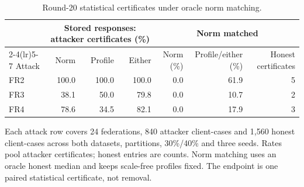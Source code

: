 \begin{table}[t]\centering\footnotesize\setlength{\tabcolsep}{4pt}
\caption{Round-20 statistical certificates under oracle norm matching.}\label{tab:norm-matching}
\begin{tabular}{lrrrrrr}\toprule
& \multicolumn{3}{c}{Stored responses: attacker certificates (\%)} & \multicolumn{3}{c}{Norm matched} \\
\cmidrule(lr){2-4}\cmidrule(lr){5-7}
Attack & Norm & Profile & Either & Norm (\%) & Profile/either (\%) & Honest certificates \\ \midrule
FR2 & 100.0 & 100.0 & 100.0 & 0.0 & 61.9 & 5 \\
FR3 & 38.1 & 50.0 & 79.8 & 0.0 & 10.7 & 2 \\
FR4 & 78.6 & 34.5 & 82.1 & 0.0 & 17.9 & 3 \\
\bottomrule\end{tabular}
\par\smallskip\parbox{.96\textwidth}{\scriptsize Each attack row covers 24 federations, 840 attacker client-cases and 1,560 honest client-cases across both datasets, partitions, 30\%/40\% and three seeds. Rates pool attacker certificates; honest entries are counts. Norm matching uses an oracle honest median and keeps scale-free profiles fixed. The endpoint is one paired statistical certificate, not removal.}
\end{table}
